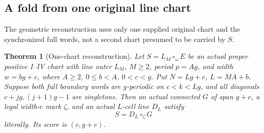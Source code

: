 \documentclass[11pt,a4paper]{amsart}
\numberwithin{equation}{section}
\theoremstyle{plain}
\newtheorem{theorem}{Theorem}[section]
\theoremstyle{definition}
\begin{document}
\subsection{A fold from one original line chart}

The geometric reconstruction uses only one supplied original chart and
the synchronized full words, not a second chart presumed to be carried by \(S\).

\begin{theorem}[One-chart reconstruction]\label{thm:fold}
Let \(S=L_M\circ_\omega E\) be an actual proper positive I--IV chart with
line outer \(L_M\), \(M\ge2\), period \(p=Ag\), and width \(w=bg+c\), where
\(A\ge2\), \(0\le b<A\), \(0<c<g\).  Put \(N=Lg+c\), \(L=MA+b\).
Suppose both full boundary words are \(g\)-periodic on \(c<k<Lg\), and
all diagonals \(c+jg,(j+1)g-1\) are singletons.  Then an actual connected
\(G\) of span \(g+c\), a legal width-\(c\) mark \(\zeta\), and an actual \(L\)-cell
line \(D_L\) satisfy
\begin{equation}\label{eq:actual-fold}
 S=D_L\circ_\zeta G
\end{equation}
literally.  Its score is \((c,g+c)\).
\end{theorem}
\end{document}
